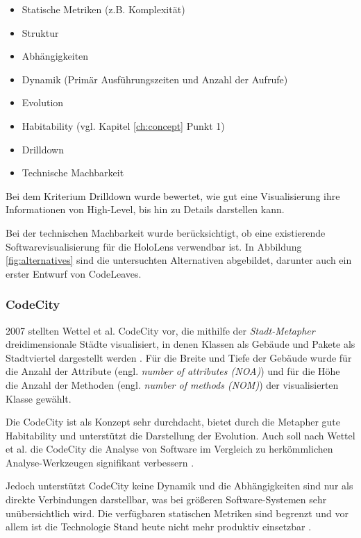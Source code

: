 \begin{itemize}
  \item Statische Metriken (z.B. Komplexität)
  \item Struktur
  \item Abhängigkeiten
  \item Dynamik (Primär Ausführungszeiten und Anzahl der Aufrufe)
  \item Evolution
  \item Habitability (vgl. Kapitel \ref{ch:concept} Punkt 1)
  \item Drilldown
  \item Technische Machbarkeit
\end{itemize}

Bei dem Kriterium Drilldown wurde bewertet, wie gut eine Visualisierung ihre Informationen von High-Level, bis hin zu Details darstellen kann.

Bei der technischen Machbarkeit wurde berücksichtigt, ob eine existierende Softwarevisualisierung für die HoloLens verwendbar ist. In Abbildung \ref{fig:alternatives} sind die untersuchten Alternativen abgebildet, darunter auch ein erster Entwurf von CodeLeaves.

\subsubsection*{CodeCity}
2007 stellten Wettel et al. CodeCity vor, die mithilfe der \textit{Stadt-Metapher} dreidimensionale Städte visualisiert, in denen Klassen als Gebäude und Pakete als Stadtviertel dargestellt werden \cite{wettel2007program, wettel2008visual, wettel2011software}. Für die Breite und Tiefe der Gebäude wurde für die Anzahl der Attribute (engl. \emph{number of attributes (NOA)}) und für die Höhe die Anzahl der Methoden (engl. \emph{number of methods (NOM)}) der visualisierten Klasse gewählt.

Die CodeCity ist als Konzept sehr durchdacht, bietet durch die Metapher gute Habitability und unterstützt die Darstellung der Evolution. Auch soll nach Wettel et al. die CodeCity die Analyse von Software im Vergleich zu herkömmlichen Analyse-Werkzeugen signifikant verbessern \cite{wettel2011software}.

Jedoch unterstützt CodeCity keine Dynamik und die Abhängigkeiten sind nur als direkte Verbindungen darstellbar, was bei größeren Software-Systemen sehr unübersichtlich wird. Die verfügbaren statischen Metriken sind begrenzt und vor allem ist die Technologie Stand heute nicht mehr produktiv einsetzbar \cite{puetz2017softwarevisualisierung}.


